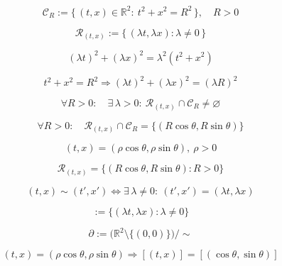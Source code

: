 \documentclass[12pt]{article}
\begin{document}
\begin{equation}
\mathcal{C}_R:=\bigl\{\,(t,x)\in\mathbb{R}^2:\ t^2+x^2=R^2\,\bigr\},\quad R>0
\end{equation}

\begin{equation}
\mathcal{R}_{(t,x)}:=\bigl\{\,(\lambda t,\lambda x):\lambda\neq 0\,\bigr\}
\end{equation}

\begin{equation}
(\lambda t)^2+(\lambda x)^2=\lambda^2(t^2+x^2)
\end{equation}

\begin{equation}
t^2+x^2=R^2\Rightarrow (\lambda t)^2+(\lambda x)^2=(\lambda R)^2
\end{equation}

\begin{equation}
\forall R>0:\quad \exists\,\lambda>0:\ \mathcal{R}_{(t,x)}\cap \mathcal{C}_R\neq\varnothing
\end{equation}

\begin{equation}
\forall R>0:\quad \mathcal{R}_{(t,x)}\cap \mathcal{C}_R=\{(R\cos\theta,R\sin\theta)\}
\end{equation}

\begin{equation}
(t,x)=(\rho\cos\theta,\rho\sin\theta),\ \rho>0
\end{equation}

\begin{equation}
\mathcal{R}_{(t,x)}=\{(R\cos\theta,R\sin\theta):R>0\}
\end{equation}

\begin{equation}
(t,x)\sim(t',x')
\iff
\exists\,\lambda\neq 0:\ (t',x')=(\lambda t,\lambda x)
\end{equation}

\begin{equation}
[(t,x)]:=\{(\lambda t,\lambda x):\lambda\neq 0\}
\end{equation}

\begin{equation}
\partial:=\bigl(\mathbb{R}^2\setminus\{(0,0)\}\bigr)\big/{\sim}
\end{equation}

\begin{equation}
(t,x)=(\rho\cos\theta,\rho\sin\theta)\Rightarrow [(t,x)]=[(\cos\theta,\sin\theta)]
\end{equation}
\end{document}
